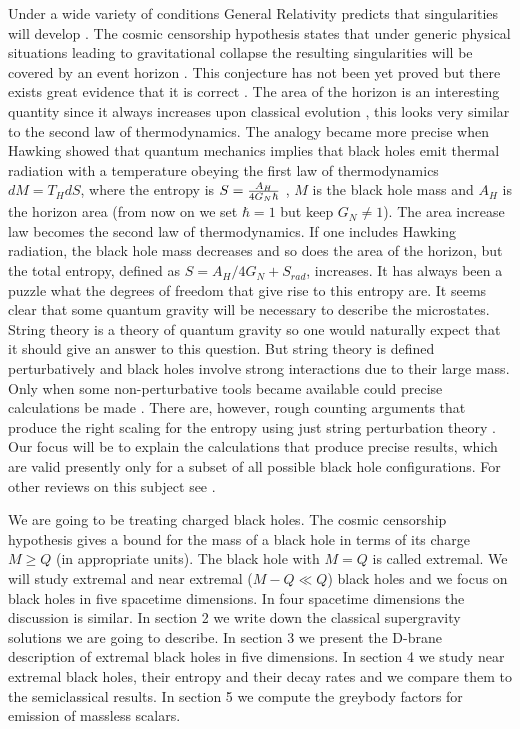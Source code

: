 Under a wide variety of conditions General Relativity predicts
that singularities will develop \cite{hawkingellis}. 
The cosmic censorship hypothesis states that 
under generic physical situations leading to gravitational collapse
the resulting singularities will be covered by an event horizon 
\cite{censor}. This conjecture has not been yet  proved but there
exists great evidence that it is correct \cite{waldaps}.
The area of the horizon is an interesting quantity since it
always increases upon classical evolution \cite{areaincrease}, 
this looks very similar to the second law of thermodynamics.
The analogy became more precise when Hawking showed \cite{hawrad} that
quantum mechanics implies that black holes emit thermal radiation
with a temperature obeying the first law of thermodynamics 
$d M = T_H d S $,  where the entropy is $S = { A_H \over 4 G_N \hbar }$ 
\cite{hawkingentropy}, 
 $M$ is the black hole mass and $A_H$ is the horizon area 
(from now on we set $\hbar =1 $ but keep $G_N \not = 1$).
The area increase law becomes the second law of thermodynamics.
If one includes Hawking radiation, the black hole mass decreases and
so does the area of the horizon, but the total entropy, defined as 
$S = {A_H /4G_N } + S_{rad}$,  increases.
It has always been a puzzle what the degrees of freedom that give rise
to this entropy are. It seems  clear that some quantum gravity will be
necessary
to describe the microstates. 
String theory \cite{REV} is a theory of quantum gravity so one would naturally 
expect that it should give an answer to this question. 
But string theory is defined perturbatively and black holes
involve strong interactions due to their  large mass. Only when
some non-perturbative tools became available \cite{polchinski,daipol}
could 
 precise calculations  be 
 made \cite{sv}. There are, however,  rough counting arguments
that produce the right scaling for the entropy using just string
perturbation theory \cite{lenyspeculations,senstrings,ghjp}.
Our focus will be to explain the calculations that produce precise
results, which are valid presently only for a  subset of all possible
black hole configurations. For other reviews on this subject 
see \cite{horrev}.

We are going to be treating charged black holes. The cosmic censorship
hypothesis gives a bound for the mass of a black hole in terms of
its charge $M \ge Q$ (in appropriate units). The black hole with $M =Q$ is
called
extremal. We will study extremal and near extremal ($M - Q \ll Q$)
black
holes and we focus on black holes in five spacetime dimensions.
In four spacetime dimensions the discussion is similar.
In section 2 
we write  down the classical supergravity solutions we are going to 
describe. In section 3 we present the D-brane description 
of extremal black holes in five dimensions.
In section 4 we study  near extremal black holes, their entropy and their
decay rates and we compare them to the semiclassical results.
In section 5 we compute the greybody factors for emission of
massless scalars. 




